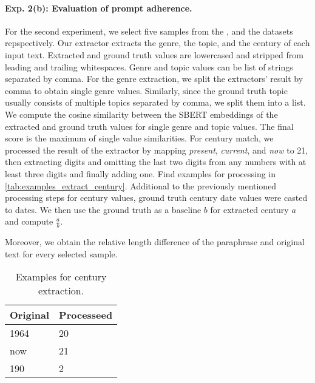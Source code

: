 \paragraph{Exp. 2(b): Evaluation of prompt adherence.}
For the second experiment, we select five samples from the \dataBlog{}, \dataGutenberg{} and the \dataStudent{} datasets repspectively. 
Our extractor extracts the genre, the topic, and the century of each input text.
Extracted and ground truth values are lowercased and stripped from leading and trailing whitespaces. 
Genre and topic values can be list of strings separated by comma.
For the genre extraction, we split the extractors' result by comma to obtain single genre values.
Similarly, since the ground truth topic usually consists of multiple topics separated by comma, we split them into a list.
We compute the cosine similarity between the SBERT embeddings of the extracted and ground truth values for single genre and topic values.
The final score is the maximum of single value similarities.
For century match, we processed the result of the extractor by mapping \textit{present}, \textit{current}, and \textit{now} to 21, then extracting digits and omitting the last two digits from any numbers with at least three digits and finally adding one.
Find examples for processing in \autoref{tab:examples_extract_century}.
Additional to the previously mentioned processing steps for century values, ground truth century date values were casted to dates.
We then use the ground truth as a baseline $b$ for extracted century $a$ and compute $\frac{a}{b}$.

Moreover, we obtain the relative length difference of the paraphrase and original text for every selected sample. 

\begin{table}[h]
\centering
\caption{Examples for century extraction.}
\label{tab:examples_extract_century}
\begin{tabular}{ll}
    \toprule
\textbf{Original} & \textbf{Processeed} \\
\midrule
1964              & 20                  \\
now               & 21                  \\
190               & 2     \\
\bottomrule             
\end{tabular}%
\end{table}

